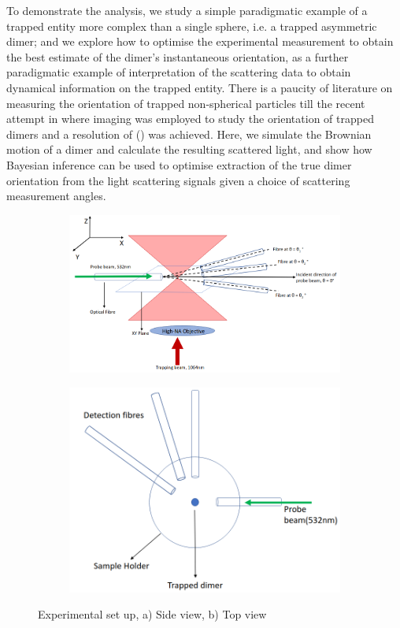 \documentclass[final, 3p]{elsarticle}
\begin{document}
To demonstrate the analysis, we study a simple paradigmatic example of a trapped entity more complex than a single sphere, i.e. a trapped asymmetric dimer; and we explore how to optimise the experimental measurement to obtain the best estimate of the dimer's instantaneous orientation, as a further paradigmatic example of interpretation of the scattering data to obtain dynamical information on the trapped entity. There is a paucity of literature on measuring the orientation of trapped non-spherical particles till the recent attempt in \cite{raudsepp2022estimating} where imaging was employed to study the orientation of trapped dimers and a resolution of () was achieved. Here, we simulate the Brownian motion of a dimer and calculate the resulting scattered light, and show how Bayesian inference can be used to optimise extraction of the true dimer orientation from the light scattering signals given a choice of scattering measurement angles. 


\begin{figure}
	\centering
	\begin{subfigure}{0.45\textwidth}
		\includegraphics[width=\textwidth, height=0.25\textheight]{./Images/fig1a.png}
		\subcaption{}
	\end{subfigure}
	\begin{subfigure}{0.45\textwidth}
		\includegraphics[width=\textwidth, height=0.25\textheight]{./Images/fig1b.png}
		\subcaption{}
	\end{subfigure}
	\caption{Experimental set up, a) Side view, b) Top view }
	\label{fig:setup}
\end{figure}
\end{document}
